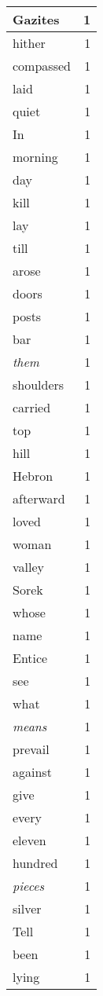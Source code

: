 \begin{center}
\begin{longtable}{l|r}
Gazites & 1\\ \hline 
hither & 1\\ \hline 
compassed & 1\\ \hline 
laid & 1\\ \hline 
quiet & 1\\ \hline 
In & 1\\ \hline 
morning & 1\\ \hline 
day & 1\\ \hline 
kill & 1\\ \hline 
lay & 1\\ \hline 
till & 1\\ \hline 
arose & 1\\ \hline 
doors & 1\\ \hline 
posts & 1\\ \hline 
bar & 1\\ \hline 
\emph{them} & 1\\ \hline 
shoulders & 1\\ \hline 
carried & 1\\ \hline 
top & 1\\ \hline 
hill & 1\\ \hline 
Hebron & 1\\ \hline 
afterward & 1\\ \hline 
loved & 1\\ \hline 
woman & 1\\ \hline 
valley & 1\\ \hline 
Sorek & 1\\ \hline 
whose & 1\\ \hline 
name & 1\\ \hline 
Entice & 1\\ \hline 
see & 1\\ \hline 
what & 1\\ \hline 
\emph{means} & 1\\ \hline 
prevail & 1\\ \hline 
against & 1\\ \hline 
give & 1\\ \hline 
every & 1\\ \hline 
eleven & 1\\ \hline 
hundred & 1\\ \hline 
\emph{pieces} & 1\\ \hline 
silver & 1\\ \hline 
Tell & 1\\ \hline 
been & 1\\ \hline 
lying & 1\\ \hline 

\end{longtable}
\end{center}

